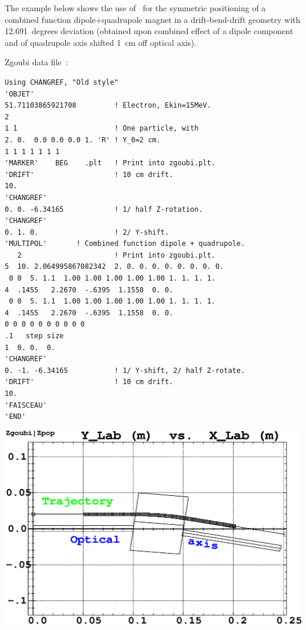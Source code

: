 {%

\medskip


\noindent The example below shows the use of  \CHANGREF\ for the symmetric positioning of 
a combined function dipole+quadrupole  magnet in a drift-bend-drift geometry with 
12.691~degrees deviation (obtained upon combined effect of  a dipole component and 
of quadrupole axis shifted 1~cm off optical axis). 

\medskip

\begin{minipage}{1.\linewidth}
\begin{minipage}{.52\linewidth}

 Zgoubi data file~: 

\footnotesize
\begin{verbatim}
Using CHANGREF, "Old style"
'OBJET'
51.71103865921708         ! Electron, Ekin=15MeV.
2
1 1                       ! One particle, with
2. 0.  0.0 0.0 0.0 1. 'R' ! Y_0=2 cm. 
1 1 1 1 1 1 1 
'MARKER'    BEG    .plt   ! Print into zgoubi.plt.
'DRIFT'                   ! 10 cm drift.
10.
'CHANGREF'  
0. 0. -6.34165            ! 1/ half Z-rotation.
'CHANGREF'  
0. 1. 0.                  ! 2/ Y-shift.
'MULTIPOL'       ! Combined function dipole + quadrupole.
   2                      ! Print into zgoubi.plt.
5  10. 2.064995867082342  2. 0. 0. 0. 0. 0. 0. 0. 0.
 0 0  5. 1.1  1.00 1.00 1.00 1.00 1.00 1. 1. 1. 1.                              
4  .1455   2.2670  -.6395  1.1558  0. 0.  
 0 0  5. 1.1  1.00 1.00 1.00 1.00 1.00 1. 1. 1. 1.                              
4  .1455   2.2670  -.6395  1.1558  0. 0.  
0 0 0 0 0 0 0 0 0 0
.1   step size
1  0. 0.  0.
'CHANGREF'
0. -1. -6.34165           ! 1/ Y-shift, 2/ half Z-rotate.
'DRIFT'                   ! 10 cm drift.
10.
'FAISCEAU'
'END'
\end{verbatim}
\normalsize
\end{minipage}\hspace{.05\linewidth}
\begin{minipage}{.35\linewidth}
\centerline{\includegraphics*[bbllx=20,bblly=100,bburx=567,bbury=470,width=1.\linewidth]{FigCHAREFb.eps}}


\end{minipage}
\end{minipage}}
